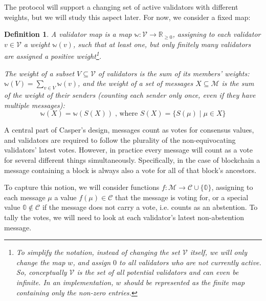 \documentclass[12pt]{article}
\newtheorem{definition}{Definition}
\begin{document}
The protocol will support a changing set of active validators with different weights, but we will study this aspect later. For now, we consider a fixed map:

\begin{definition}
  A \emph{validator map} is a map $\mathbb{w}: \mathcal{V} \rightarrow \mathbb{R}_{\geq 0}$, assigning to each validator $v \in \mathcal{V}$ a \emph{weight} $\mathbb{w}(v)$, such that at least one, but only finitely many validators are assigned a positive weight\footnote{To simplify the notation, instead of changing the set $\mathcal{V}$ itself, we will only change the map $w$, and assign $0$ to all validators who are not currently active. So, conceptually $\mathcal{V}$ is the set of all \emph{potential} validators and can even be infinite. In an implementation, $w$ should be represented as the finite map containing only the non-zero entries.}.

  The \emph{weight} of a subset $V \subseteq \mathcal{V}$ of validators is the sum of its members' weights: $\mathbb{w}(V) = \sum_{v \in V} \mathbb{w}(v)$, and the \emph{weight} of a set of messages $X \subseteq \mathcal{M}$ is the sum of the weight of their senders (counting each sender only once, even if they have multiple messages):
  $$\mathbb{w}(X) = \mathbb{w}(S(X)) \;\text{, where } S(X) = \{ S(\mu) \mid \mu \in X\}$$
\end{definition}

A central part of Casper's design,  messages count as votes for consensus values, and validators are required to follow the plurality of the non-equivocating validators' latest votes. However, in practice every message will count as a vote for several different things simultaneously. Specifically, in the case of blockchain a message containing a block is always also a vote for all of that block's ancestors.

To capture this notion, we will consider functions $f: \mathcal{M} \rightarrow \mathcal{C} \cup \{ \mathbb{0} \}$, assigning to each message $\mu$ a value $f(\mu) \in \mathcal{C}$ that the message is voting for, or a special value $\mathbb{0} \notin \mathcal{C}$ if the message does not carry a vote, i.e. counts as an abstention. To tally the votes, we will need to look at each validator's latest non-abstention message.
\end{document}
